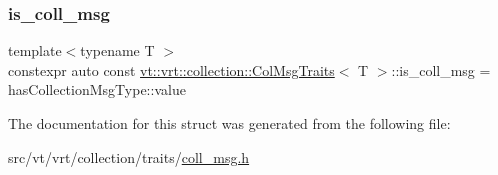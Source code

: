 \subsubsection{\texorpdfstring{is\+\_\+coll\+\_\+msg}{is\_coll\_msg}}
{\footnotesize\ttfamily template$<$typename T $>$ \\
constexpr auto const \hyperlink{structvt_1_1vrt_1_1collection_1_1_col_msg_traits}{vt\+::vrt\+::collection\+::\+Col\+Msg\+Traits}$<$ T $>$\+::is\+\_\+coll\+\_\+msg = has\+Collection\+Msg\+Type\+::value\hspace{0.3cm}{\ttfamily [static]}}



The documentation for this struct was generated from the following file\+:\begin{DoxyCompactItemize}
\item 
src/vt/vrt/collection/traits/\hyperlink{coll__msg_8h}{coll\+\_\+msg.\+h}\end{DoxyCompactItemize}
